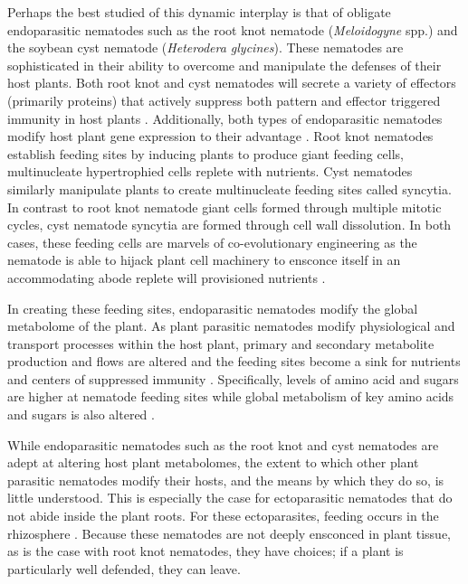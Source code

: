 \documentclass[9pt,lineno]{elife}
\begin{document}
Perhaps the best studied of this dynamic interplay is that of obligate endoparasitic nematodes such as the root knot nematode (\textit{Meloidogyne}  spp.) and the soybean cyst nematode (\textit{Heterodera glycines}).  These nematodes are sophisticated in their ability to overcome and manipulate the defenses of their host plants.  Both root knot and cyst nematodes will secrete a variety of effectors (primarily proteins) that actively suppress both pattern and effector triggered immunity in host plants \citep{mitchum2013nematode, mantelin2015suppression, vanholme2004secretions, vieira2019plant}.  Additionally, both types of endoparasitic nematodes modify host plant gene expression to their advantage \citep{de2015plant}.  Root knot nematodes establish feeding sites by inducing plants to produce giant feeding cells, multinucleate hypertrophied cells replete with nutrients. Cyst nematodes similarly manipulate plants to create multinucleate feeding sites  called syncytia. In contrast to root knot nematode giant cells formed through multiple mitotic cycles, cyst nematode syncytia are formed through cell wall dissolution.   In both cases, these feeding cells are marvels of co-evolutionary engineering as the nematode is able to hijack plant cell machinery to ensconce itself in an accommodating abode replete will provisioned nutrients \citep{siddique2018parasitic, de2015plant,siddique2015metabolism}.  

In creating these feeding sites, endoparasitic nematodes modify the global metabolome of the plant.  As plant parasitic nematodes modify physiological and transport processes within the host plant, primary and secondary metabolite production and flows are altered and the feeding sites become a sink for nutrients and centers of suppressed immunity \citep{bartlem2013vascularization}.  Specifically, levels of amino acid and sugars are higher at nematode feeding sites \citep{siddique2015metabolism} while global metabolism of key amino acids and sugars is also altered \citep{eloh2016untargeted, hofmann2010metabolic}.  


While endoparasitic nematodes such as the root knot and cyst nematodes are adept at altering host plant metabolomes, the extent to which other plant parasitic nematodes modify their hosts, and the means by which they do so, is little understood.  This is especially the case for ectoparasitic nematodes that do not abide inside the plant roots.  For these ectoparasites, feeding occurs in the rhizosphere \citep{sijmons1994parasitic}.  Because these nematodes are not deeply ensconced in plant tissue, as is the case with root knot nematodes, they have choices; if a plant is particularly well defended, they can leave.  
\end{document}
